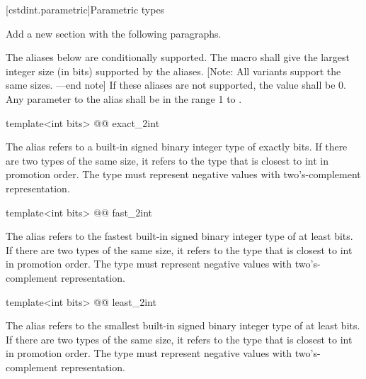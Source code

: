 [cstdint.parametric]{Parametric types}

Add a new section with the following paragraphs.

\begin{addedblock}
The aliases below are conditionally supported. The macro  shall give the largest integer size (in bits) supported by the aliases. [Note: All variants support the same sizes. —end note] If these aliases are not supported, the value shall be 0. Any parameter to the alias shall be in the range 1 to .

\begin{itemdecl}
template<int bits> @@ exact_2int    
\end{itemdecl}

\begin{itemdescr}
The alias  refers to a built-in signed binary integer type of exactly  bits. If there are two types of the same size, it refers to the type that is closest to int in promotion order. The type must represent negative values with two's-complement representation.    
\end{itemdescr}

\begin{itemdecl}
template<int bits> @@ fast_2int    
\end{itemdecl}

\begin{itemdescr}
The alias  refers to the fastest built-in signed binary integer type of at least  bits. If there are two types of the same size, it refers to the type that is closest to int in promotion order. The type must represent negative values with two's-complement representation.    
\end{itemdescr} 

\begin{itemdecl}
template<int bits> @@ least_2int    
\end{itemdecl}

\begin{itemdescr}
The alias  refers to the smallest built-in signed binary integer type of at least  bits. If there are two types of the same size, it refers to the type that is closest to int in promotion order. The type must represent negative values with two's-complement representation.    
\end{itemdescr} 


\end{addedblock}
